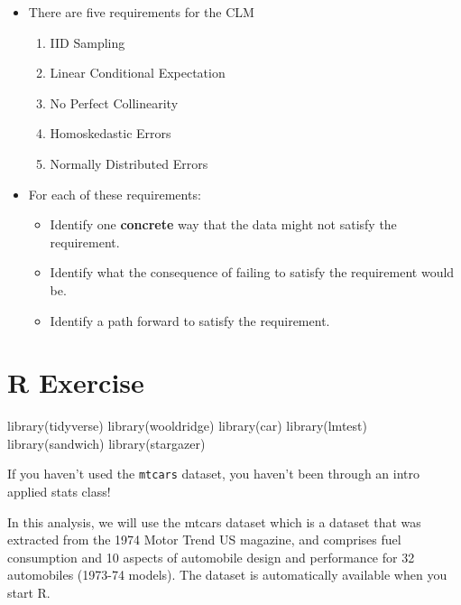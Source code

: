 \documentclass[
  letterpaper,
  DIV=11,
  numbers=noendperiod]{scrreprt}
\newenvironment{Shaded}{\begin{snugshade}}{\end{snugshade}}
\newcommand{\FunctionTok}[1]{\textcolor[rgb]{0.28,0.35,0.67}{#1}}
\newcommand{\NormalTok}[1]{\textcolor[rgb]{0.00,0.23,0.31}{#1}}
\providecommand{\tightlist}{%
  \setlength{\itemsep}{0pt}\setlength{\parskip}{0pt}}\usepackage{longtable,booktabs,array}
\begin{document}
\begin{itemize}
\item
  There are five requirements for the CLM

  \begin{enumerate}
  \def\labelenumi{\arabic{enumi}.}
  \tightlist
  \item
    IID Sampling
  \item
    Linear Conditional Expectation
  \item
    No Perfect Collinearity
  \item
    Homoskedastic Errors
  \item
    Normally Distributed Errors
  \end{enumerate}
\item
  For each of these requirements:

  \begin{itemize}
  \tightlist
  \item
    Identify one \textbf{concrete} way that the data might not satisfy
    the requirement.
  \item
    Identify what the consequence of failing to satisfy the requirement
    would be.
  \item
    Identify a path forward to satisfy the requirement.
  \end{itemize}
\end{itemize}

\section{R Exercise}\label{r-exercise-3}

\begin{Shaded}
\begin{Highlighting}[]
\FunctionTok{library}\NormalTok{(tidyverse)}
\FunctionTok{library}\NormalTok{(wooldridge)}
\FunctionTok{library}\NormalTok{(car)}
\FunctionTok{library}\NormalTok{(lmtest)}
\FunctionTok{library}\NormalTok{(sandwich)}
\FunctionTok{library}\NormalTok{(stargazer)}
\end{Highlighting}
\end{Shaded}

If you haven't used the \texttt{mtcars} dataset, you haven't been
through an intro applied stats class!

In this analysis, we will use the mtcars dataset which is a dataset that
was extracted from the 1974 Motor Trend US magazine, and comprises fuel
consumption and 10 aspects of automobile design and performance for 32
automobiles (1973-74 models). The dataset is automatically available
when you start R.
\end{document}
